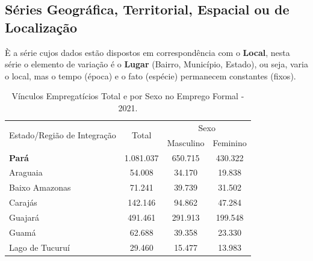 \newpage

\subsection{Séries Geográfica, Territorial, Espacial ou de Localização}

\inic È a série cujos dados estão dispostos em correspondência com o \textbf{Local}, nesta série o elemento de variação é o \textbf{Lugar} (Bairro, Município, Estado), ou seja, varia o local, mas o tempo (época) e o fato (espécie) permanecem constantes (fixos).




\begin{table}[!htb]
\centering
    {
    \caption{Vínculos Empregatícios Total e por Sexo no Emprego Formal - 2021.}
    \label{obitos2}
    \vspace{0.1cm}
\begin{tabular}{l|c|c|c}
\hline\hline
\multirow{2}{*}{Estado/Região de Integração} & \multicolumn{1}{c|}{\multirow{2}{*}{Total}} & \multicolumn{2}{c}{Sexo}                                     \\ \cline{3-4} 
                           & \multicolumn{1}{c|}{}                       & \multicolumn{1}{c|}{Masculino} & \multicolumn{1}{c}{Feminino} \\ \cline{1-2}
\hline
\textbf{Pará}              &  1.081.037                                 &  650.715                      &   430.322                    \\
Araguaia                   &  54.008                                    &  34.170                       &   19.838                     \\
Baixo Amazonas             &  71.241                                    &  39.739                       &   31.502                     \\
Carajás                    &  142.146                                   &  94.862                       &   47.284                     \\
Guajará                    &  491.461                                   &  291.913                      &   199.548                     \\
Guamá                      &  62.688                                    &  39.358                       &   23.330                      \\
Lago de Tucuruí            &  29.460                                    &  15.477                       &   13.983                       \\

\end{tabular}}
\end{table}
